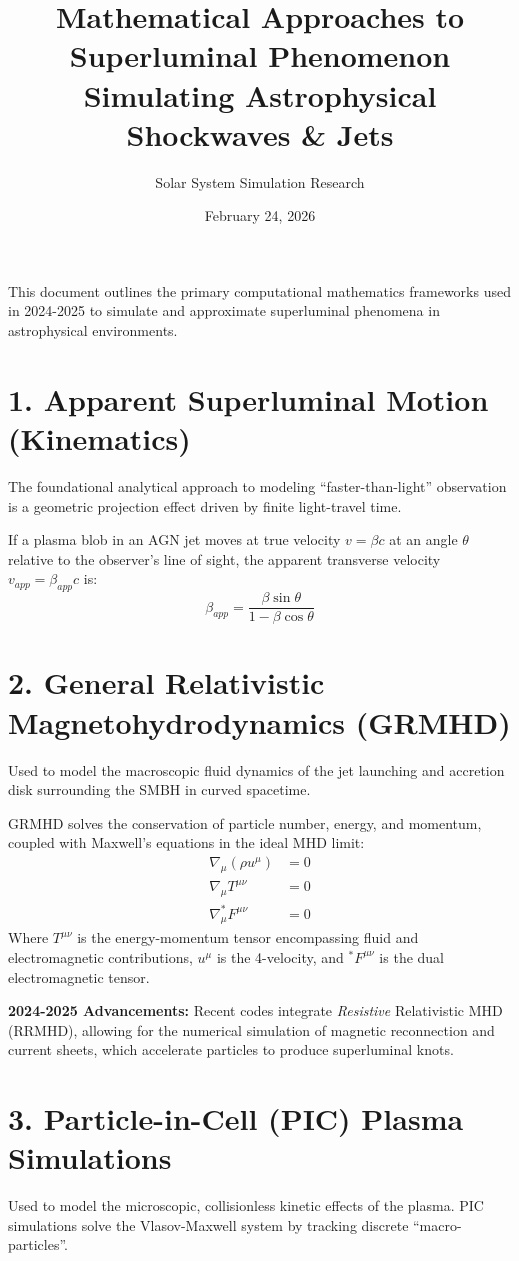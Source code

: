 \documentclass{article}
\title{Mathematical Approaches to Superluminal Phenomenon \\ \large Simulating Astrophysical Shockwaves \& Jets}
\author{Solar System Simulation Research}
\date{February 24, 2026}
\begin{document}
\maketitle

This document outlines the primary computational mathematics frameworks used in 2024-2025 to simulate and approximate superluminal phenomena in astrophysical environments.

\section*{1. Apparent Superluminal Motion (Kinematics)}
The foundational analytical approach to modeling ``faster-than-light'' observation is a geometric projection effect driven by finite light-travel time.

If a plasma blob in an AGN jet moves at true velocity $v = \beta c$ at an angle $\theta$ relative to the observer's line of sight, the apparent transverse velocity $v_{app} = \beta_{app} c$ is:
\begin{equation}
    \beta_{app} = \frac{\beta \sin\theta}{1 - \beta \cos\theta}
\end{equation}

\section*{2. General Relativistic Magnetohydrodynamics (GRMHD)}
Used to model the macroscopic fluid dynamics of the jet launching and accretion disk surrounding the SMBH in curved spacetime.

GRMHD solves the conservation of particle number, energy, and momentum, coupled with Maxwell's equations in the ideal MHD limit:
\begin{align}
    \nabla_\mu (\rho u^\mu) &= 0 \\
    \nabla_\mu T^{\mu\nu} &= 0 \\
    \nabla_\mu ^*F^{\mu\nu} &= 0
\end{align}
Where $T^{\mu\nu}$ is the energy-momentum tensor encompassing fluid and electromagnetic contributions, $u^\mu$ is the 4-velocity, and $^*F^{\mu\nu}$ is the dual electromagnetic tensor. 

\textbf{2024-2025 Advancements:} Recent codes integrate \textit{Resistive} Relativistic MHD (RRMHD), allowing for the numerical simulation of magnetic reconnection and current sheets, which accelerate particles to produce superluminal knots.

\section*{3. Particle-in-Cell (PIC) Plasma Simulations}
Used to model the microscopic, collisionless kinetic effects of the plasma. PIC simulations solve the Vlasov-Maxwell system by tracking discrete ``macro-particles''.
\end{document}
